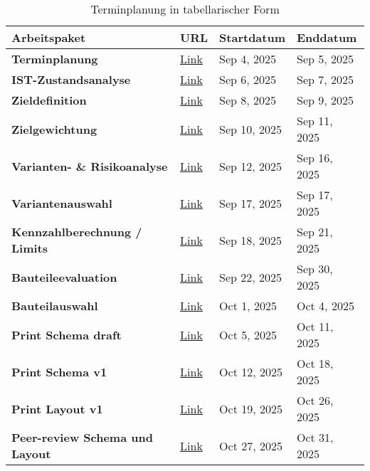 \begin{table}[!ht]
	\centering
	\caption{Terminplanung in tabellarischer Form}
	\begin{tabularx}{388pt}{|l|l|l|l|}
		\textbf{Arbeitspaket} & \textbf{URL} & \textbf{Startdatum} & \textbf{Enddatum} \\\hline
		\textbf{Terminplanung} & \href{https://github.com/Violabitch5/Nathophone\_doc/issues/1}{Link} & Sep 4, 2025 & Sep 5, 2025 \\ 
		\textbf{IST-Zustandsanalyse} & \href{https://github.com/Violabitch5/Nathophone\_doc/issues/4}{Link} & Sep 6, 2025 & Sep 7, 2025 \\ 
		\textbf{Zieldefinition} & \href{https://github.com/Violabitch5/Nathophone\_doc/issues/3}{Link} & Sep 8, 2025 & Sep 9, 2025 \\ 
		\textbf{Zielgewichtung} & \href{https://github.com/Violabitch5/Nathophone\_doc/issues/5}{Link} & Sep 10, 2025 & Sep 11, 2025 \\ 
		\textbf{Varianten- \& Risikoanalyse} & \href{https://github.com/Violabitch5/Nathophone\_doc/issues/6}{Link} & Sep 12, 2025 & Sep 16, 2025 \\ 
		\textbf{Variantenauswahl} & \href{https://github.com/Violabitch5/Nathophone\_doc/issues/7}{Link} & Sep 17, 2025 & Sep 17, 2025 \\ 
		\hdashline
		\textbf{Kennzahlberechnung / Limits} & \href{https://github.com/Violabitch5/Nathophone\_elec/issues/1}{Link} & Sep 18, 2025 & Sep 21, 2025 \\ 
		\textbf{Bauteileevaluation} & \href{https://github.com/Violabitch5/Nathophone\_elec/issues/2}{Link} & Sep 22, 2025 & Sep 30, 2025 \\ 
		\textbf{Bauteilauswahl} & \href{https://github.com/Violabitch5/Nathophone\_elec/issues/3}{Link} & Oct 1, 2025 & Oct 4, 2025 \\ 
		\textbf{Print Schema draft} & \href{https://github.com/Violabitch5/Nathophone\_elec/issues/4}{Link} & Oct 5, 2025 & Oct 11, 2025 \\ 
		\textbf{Print Schema v1} & \href{https://github.com/Violabitch5/Nathophone\_elec/issues/5}{Link} & Oct 12, 2025 & Oct 18, 2025 \\ 
		\textbf{Print Layout v1} & \href{https://github.com/Violabitch5/Nathophone\_elec/issues/6}{Link} & Oct 19, 2025 & Oct 26, 2025 \\ 
		\textbf{Peer-review Schema und Layout} & \href{https://github.com/Violabitch5/Nathophone\_elec/issues/7}{Link} & Oct 27, 2025 & Oct 31, 2025 \\ 

\end{tabularx}
\end{table}
